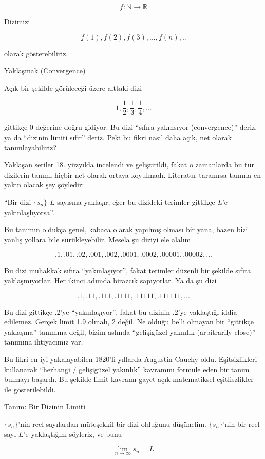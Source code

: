 \documentclass[12pt,fleqn]{article}\usepackage{../../common}
\begin{document}
$$ f: \mathbb{N} \to \mathbb{R} $$

Dizimizi 

$$ f(1),f(2),f(3),...,f(n),.. $$

olarak gösterebiliriz. 

Yaklaşmak (Convergence) 

Açık bir şekilde görüleceği üzere alttaki dizi

$$ 1,\frac{1}{2},\frac{1}{3},\frac{1}{4},... $$

gittikçe 0 değerine doğru gidiyor. Bu dizi ``sıfıra yakınsıyor
(convergence)'' deriz, ya da ``dizinin limiti sıfır'' deriz. Peki bu fikri
nasıl daha açık, net olarak tanımlayabiliriz? 

Yaklaşan seriler 18. yüzyılda incelendi ve geliştirildi, fakat o zamanlarda
bu tür dizilerin tanımı hiçbir net olarak ortaya koyulmadı. Literatur
taranırsa tanıma en yakın olacak şey şöyledir:

``Bir dizi $\{s_n\}$ $L$ sayısına yaklaşır, eğer bu dizideki terimler
gittikçe $L$'e yakınlaşlıyorsa''. 

Bu tanımın oldukça genel, kabaca olarak yapılmış olması bir yana, bazen
bizi yanlış yollara bile sürükleyebilir. Mesela şu diziyi ele alalım 

$$ .1, .01, .02, .001, .002, .0001, .0002, .00001, .00002, ... $$

Bu dizi muhakkak sıfıra ``yakınlaşıyor'', fakat terimler düzenli bir şekilde
sıfıra yaklaşmıyorlar. Her ikinci adımda birazcık sapıyorlar. Ya da şu dizi

$$ .1, .11, .111, .1111, .11111, .111111, ... $$

Bu dizi gittikçe .2'ye ``yakınlaşıyor'', fakat bu dizinin .2'ye yaklaştığı
iddia edilemez. Gerçek limit 1.9 olmalı, 2 değil. Ne olduğu belli olmayan
bir ``gittikçe yaklaşma'' tanımına değil, bizim aslında ``gelişigüzel
yakınlık (arbitrarily close)'' tanımına ihtiyacımız var.

Bu fikri en iyi yakalayabilen 1820'li yıllarda Augustin Cauchy
oldu. Eşitsizlikleri kullanarak ``herhangi / gelişigüzel yakınlık''
kavramını formüle eden bir tanım bulmayı başardı. Bu şekilde limit kavramı
gayet açık matematiksel eşitliszlikler ile gösterilebildi.

Tanım: Bir Dizinin Limiti 

$\{s_n\}$'nin reel sayılardan müteşekkil bir dizi olduğunu
düşünelim. $\{s_n\}$'nin bir reel sayı $L$'e yaklaştığını söyleriz, ve bunu

$$ \lim_{n\to\infty} s_n = L $$
\end{document}
